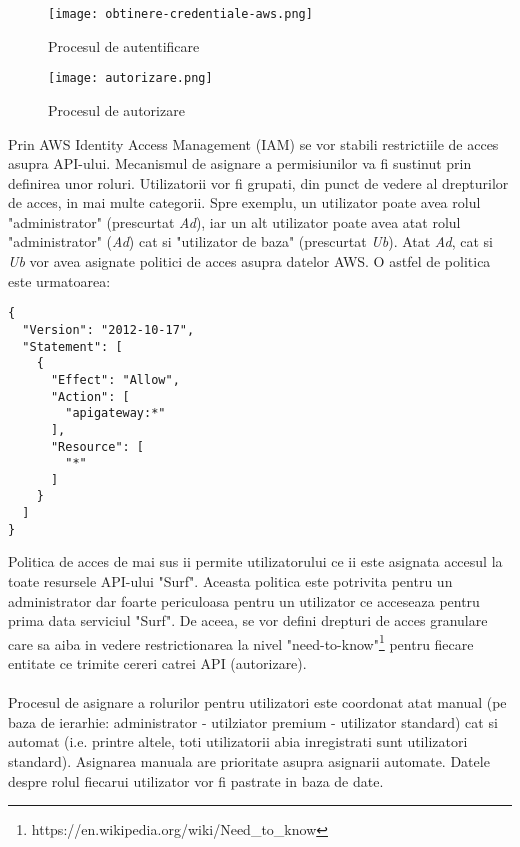 \begin{figure}[ht]
\begin{center}
	\texttt{[image: obtinere-credentiale-aws.png]}
	\caption{Procesul de autentificare \cite{diagram-icons-sources}}\par\medskip
	\vspace{10mm}
	\texttt{[image: autorizare.png]}
	\caption{Procesul de autorizare \cite{diagram-icons-sources}}\par\medskip

\end{center}
\end{figure}

\noindent
Prin AWS Identity Access Management (IAM) se vor stabili restrictiile de acces asupra API-ului. Mecanismul de asignare a permisiunilor va fi sustinut prin definirea unor roluri. Utilizatorii vor fi grupati, din punct de vedere al drepturilor de acces, in mai multe categorii. Spre exemplu, un utilizator poate avea rolul "administrator" (prescurtat \emph{Ad}), iar un alt utilizator poate avea atat rolul "administrator" (\emph{Ad}) cat si "utilizator de baza" (prescurtat \emph{Ub}). Atat \emph{Ad}, cat si \emph{Ub} vor avea asignate politici de acces asupra datelor AWS. O astfel de politica este urmatoarea:
\newpage

\begin{verbatim}
{
  "Version": "2012-10-17",
  "Statement": [
    {
      "Effect": "Allow",
      "Action": [
        "apigateway:*"
      ],
      "Resource": [
        "*"
      ]
    }
  ]
}
\end{verbatim}

\noindent
Politica de acces de mai sus ii permite utilizatorului ce ii este asignata accesul la toate resursele API-ului "Surf". Aceasta politica este potrivita pentru un administrator dar foarte periculoasa pentru un utilizator ce acceseaza pentru prima data serviciul "Surf". De aceea, se vor defini drepturi de acces granulare care sa aiba in vedere restrictionarea la nivel "need-to-know"\footnote{https://en.wikipedia.org/wiki/Need\_to\_know} pentru fiecare entitate ce trimite cereri catrei API (autorizare).
\\
\\
Procesul de asignare a rolurilor pentru utilizatori este coordonat atat manual (pe baza de ierarhie: administrator - utilziator premium - utilizator standard) cat si automat (i.e. printre altele, toti utilizatorii abia inregistrati sunt utilizatori standard). Asignarea manuala are prioritate asupra asignarii automate. Datele despre rolul fiecarui utilizator vor fi pastrate in baza de date.
\\

